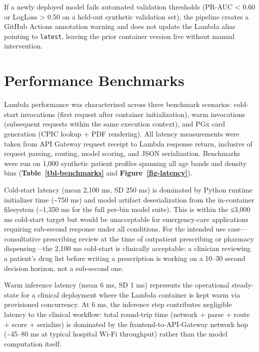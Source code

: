 \documentclass[
  12pt,
]{book}
\begin{document}
If a newly deployed model fails automated validation thresholds (PR-AUC
\textless{} 0.60 or LogLoss \textgreater{} 0.50 on a held-out synthetic
validation set), the pipeline creates a GitHub Actions annotation
warning and does not update the Lambda alias pointing to
\texttt{latest}, leaving the prior container version live without manual
intervention.

\section{Performance Benchmarks}\label{sec-benchmarks}

Lambda performance was characterized across three benchmark scenarios:
cold-start invocations (first request after container initialization),
warm invocations (subsequent requests within the same execution
context), and PGx card generation (CPIC lookup + PDF rendering). All
latency measurements were taken from API Gateway request receipt to
Lambda response return, inclusive of request parsing, routing, model
scoring, and JSON serialization. Benchmarks were run on 1,000 synthetic
patient profiles spanning all age bands and density bins
(\textbf{Table~\ref{tbl-benchmarks}} and
\textbf{Figure~\ref{fig-latency}}).

Cold-start latency (mean 2,100 ms, SD 250 ms) is dominated by Python
runtime initializer time (\textasciitilde750 ms) and model artifact
deserialization from the in-container filesystem (\textasciitilde1,350
ms for the full per-bin model suite). This is within the ≤3,000 ms
cold-start target but would be unacceptable for emergency-care
applications requiring sub-second response under all conditions. For the
intended use case---consultative prescribing review at the time of
outpatient prescribing or pharmacy dispensing---the 2,100 ms cold-start
is clinically acceptable: a clinician reviewing a patient's drug list
before writing a prescription is working on a 10--30 second decision
horizon, not a sub-second one.

Warm inference latency (mean 6 ms, SD 1 ms) represents the operational
steady-state for a clinical deployment where the Lambda container is
kept warm via provisioned concurrency. At 6 ms, the inference step
contributes negligible latency to the clinical workflow: total
round-trip time (network + parse + route + score + serialize) is
dominated by the frontend-to-API-Gateway network hop
(\textasciitilde45--80 ms at typical hospital Wi-Fi throughput) rather
than the model computation itself.
\end{document}
